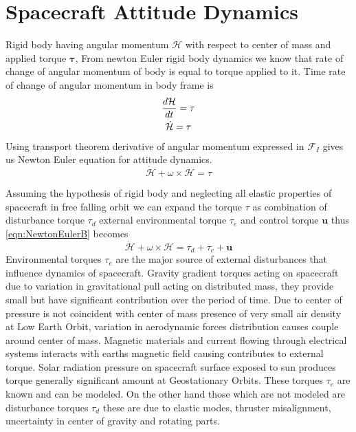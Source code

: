 \section{Spacecraft Attitude Dynamics}
Rigid body having angular momentum $\displaystyle \mathcal{H}$ with respect to center of mass and applied torque $\displaystyle \mathbf{\tau }$, From newton Euler rigid body dynamics we know that rate of change of angular momentum of body is equal to torque applied to it. Time rate of change of angular momentum in body frame is
\begin{gather}
\frac{d\mathcal{H}}{dt} =\mathbf{\tau }\\
\dot{\mathcal{H}} =\mathbf{\tau } \notag
\end{gather}
Using transport theorem derivative of angular momentum expressed in $\displaystyle \mathcal{F}_{I}$ gives us Newton Euler equation for attitude dynamics.
\begin{equation}
\dot{\mathcal{H}} +\omega \times \mathcal{H} =\tau 
\label{eqn:NewtonEulerB}
\end{equation}

\noindent Assuming the hypothesis of rigid body and neglecting all elastic properties of spacecraft in free falling orbit we can expand the torque $\displaystyle \tau $ as combination of disturbance torque $\displaystyle \tau _{d}$ external environmental torque $\displaystyle \tau _{e}$ and control torque $\displaystyle \mathbf{u}$ thus \autoref{eqn:NewtonEulerB} becomes
\begin{equation}
\dot{\mathcal{H}} +\omega \times \mathcal{H} =\tau _{d} +\tau _{e} +\mathbf{u}
\label{eqn:NewtonEulerI}
\end{equation}
Environmental torques $\displaystyle \tau _{e}$ are the major source of external disturbances that influence dynamics of spacecraft. Gravity gradient torques acting on spacecraft due to variation in gravitational pull acting on distributed mass, they provide small but have significant contribution over the period of time. Due to center of pressure is not coincident with center of mass presence of very small air density at Low Earth Orbit, variation in aerodynamic forces distribution causes couple around center of mass. Magnetic materials and current flowing through electrical systems interacts with earths magnetic field causing contributes to external torque. Solar radiation pressure on spacecraft surface exposed to sun produces torque generally significant amount at Geostationary Orbits. These torques $\displaystyle \tau _{e}$ are known and can be modeled. On the other hand those which are not modeled are disturbance torques $\displaystyle \tau _{d}$ these are due to elastic modes, thruster misalignment, uncertainty in center of gravity and rotating parts.

